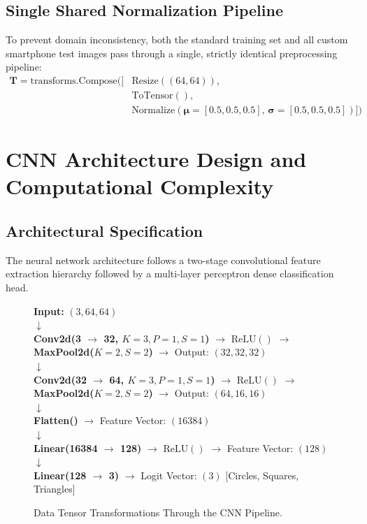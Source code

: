 \documentclass[11pt,a4paper,oneside]{report}
\begin{document}
\section{Single Shared Normalization Pipeline}
To prevent domain inconsistency, both the standard training set and all custom smartphone test images pass through a single, strictly identical preprocessing pipeline:
\begin{align}
    \mathbf{T} = \text{transforms.Compose}\Big(\big[ &\text{Resize}((64, 64)), \nonumber \\
    &\text{ToTensor}(), \nonumber \\
    &\text{Normalize}(\boldsymbol{\mu}=[0.5, 0.5, 0.5], \, \boldsymbol{\sigma}=[0.5, 0.5, 0.5]) \big]\Big)
\end{align}

\chapter{CNN Architecture Design and Computational Complexity}

\section{Architectural Specification}
The neural network architecture follows a two-stage convolutional feature extraction hierarchy followed by a multi-layer perceptron dense classification head.

\begin{figure}[H]
    \centering
    \begin{tcolorbox}[colback=codebg,colframe=primary,title=\textbf{Layer-by-Layer Data Flow Architecture}]
    \textbf{Input:} $(3, 64, 64)$ \\
    $\downarrow$ \\
    \textbf{Conv2d(3 $\to$ 32, $K=3, P=1, S=1$)} $\to$ $\text{ReLU}()$ $\to$ \textbf{MaxPool2d($K=2, S=2$)} $\to$ Output: $(32, 32, 32)$ \\
    $\downarrow$ \\
    \textbf{Conv2d(32 $\to$ 64, $K=3, P=1, S=1$)} $\to$ $\text{ReLU}()$ $\to$ \textbf{MaxPool2d($K=2, S=2$)} $\to$ Output: $(64, 16, 16)$ \\
    $\downarrow$ \\
    \textbf{Flatten()} $\to$ Feature Vector: $(16384)$ \\
    $\downarrow$ \\
    \textbf{Linear(16384 $\to$ 128)} $\to$ $\text{ReLU}()$ $\to$ Feature Vector: $(128)$ \\
    $\downarrow$ \\
    \textbf{Linear(128 $\to$ 3)} $\to$ Logit Vector: $(3)$ [Circles, Squares, Triangles]
    \end{tcolorbox}
    \caption{Data Tensor Transformations Through the CNN Pipeline.}
    \label{fig:cnn_flow}
\end{figure}
\end{document}
